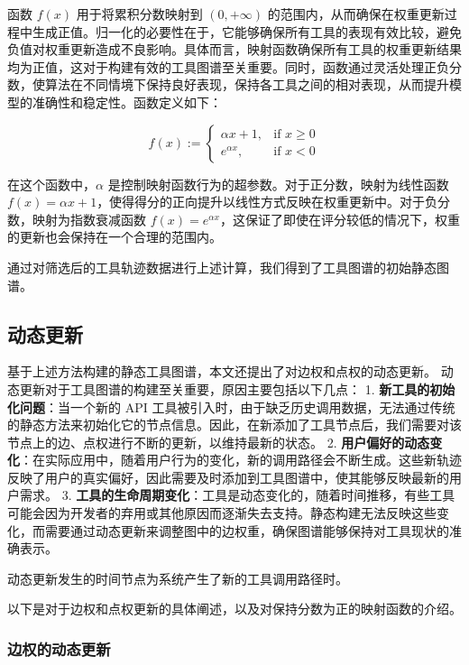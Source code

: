 函数 $f(x)$ 用于将累积分数映射到 $(0, +\infty)$ 的范围内，从而确保在权重更新过程中生成正值。归一化的必要性在于，它能够确保所有工具的表现有效比较，避免负值对权重更新造成不良影响。具体而言，映射函数确保所有工具的权重更新结果均为正值，这对于构建有效的工具图谱至关重要。同时，函数通过灵活处理正负分数，使算法在不同情境下保持良好表现，保持各工具之间的相对表现，从而提升模型的准确性和稳定性。函数定义如下：

\[
f(x) :=
\begin{cases}
\alpha x + 1, & \text{if } x \geq 0 \\
e^{\alpha x}, & \text{if } x < 0
\end{cases}
\]

在这个函数中，$\alpha$ 是控制映射函数行为的超参数。对于正分数，映射为线性函数 $f(x) = \alpha x + 1$，使得得分的正向提升以线性方式反映在权重更新中。对于负分数，映射为指数衰减函数 $f(x) = e^{\alpha x}$，这保证了即使在评分较低的情况下，权重的更新也会保持在一个合理的范围内。

通过对筛选后的工具轨迹数据进行上述计算，我们得到了工具图谱的初始静态图谱。

\subsection{动态更新}

基于上述方法构建的静态工具图谱，本文还提出了对边权和点权的动态更新。
动态更新对于工具图谱的构建至关重要，原因主要包括以下几点：
1. \textbf{新工具的初始化问题}：当一个新的 API 工具被引入时，由于缺乏历史调用数据，无法通过传统的静态方法来初始化它的节点信息。因此，在新添加了工具节点后，我们需要对该节点上的边、点权进行不断的更新，以维持最新的状态。
2. \textbf{用户偏好的动态变化}：在实际应用中，随着用户行为的变化，新的调用路径会不断生成。这些新轨迹反映了用户的真实偏好，因此需要及时添加到工具图谱中，使其能够反映最新的用户需求。
3. \textbf{工具的生命周期变化}：工具是动态变化的，随着时间推移，有些工具可能会因为开发者的弃用或其他原因而逐渐失去支持。静态构建无法反映这些变化，而需要通过动态更新来调整图中的边权重，确保图谱能够保持对工具现状的准确表示。

动态更新发生的时间节点为系统产生了新的工具调用路径时。

以下是对于边权和点权更新的具体阐述，以及对保持分数为正的映射函数的介绍。

\subsubsection{边权的动态更新}

